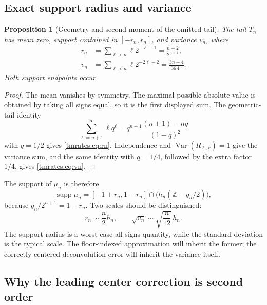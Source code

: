 \documentclass[11pt,oneside]{article}
\newtheorem{proposition}[theorem]{Proposition}
\theoremstyle{definition}
\theoremstyle{remark}
\newcommand{\Z}{\mathbb Z}
\newcommand{\Var}{\operatorname{Var}}
\newcommand{\supp}{\operatorname{supp}}
\begin{document}
\subsection{Exact support radius and variance}

\begin{proposition}[Geometry and second moment of the omitted tail]
\label{tmrates:prop:tail-moments}
The tail $T_n$ has mean zero, support contained in $[-r_n,r_n]$, and variance $v_n$, where
\begin{align}
 r_n&=\sum_{\ell>n}\ell2^{-\ell-1}
     =\frac{n+2}{2^{n+1}},                                  \label{tmrates:eq:rn}\\
 v_n&=\sum_{\ell>n}\ell2^{-2\ell-2}
     =\frac{3n+4}{36\,4^n}.                                 \label{tmrates:eq:vn}
\end{align}
Both support endpoints occur.
\end{proposition}

\begin{proof}
The mean vanishes by symmetry.  The maximal possible absolute value is obtained by taking
all signs equal, so it is the first displayed sum.  The geometric-tail identity
\[
 \sum_{\ell=n+1}^{\infty}\ell q^\ell
 =q^{n+1}\frac{(n+1)-nq}{(1-q)^2}
\]
with $q=1/2$ gives \eqref{tmrates:eq:rn}.  Independence and $\Var(R_{\ell,r})=1$ give the variance
sum, and the same identity with $q=1/4$, followed by the extra factor $1/4$, gives
\eqref{tmrates:eq:vn}.
\end{proof}

The support of $\mu_n$ is therefore
\begin{equation}
 \supp\mu_n=[-1+r_n,1-r_n]\cap\bigl(h_n(\Z-g_n/2)\bigr),  \label{tmrates:eq:support-mun}
\end{equation}
because $g_n/2^{n+1}=1-r_n$.  Two scales should be distinguished:
\begin{equation}
 r_n\sim\frac n2h_n,
 \qquad
 \sqrt{v_n}\sim\sqrt{\frac n{12}}\,h_n.                  \label{tmrates:eq:two-tail-scales}
\end{equation}
The support radius is a worst-case all-signs quantity, while the standard deviation is the
typical scale.  The floor-indexed approximation will inherit the former; the correctly
centered deconvolution error will inherit the variance itself.

\subsection{Why the leading center correction is second order}
\end{document}
